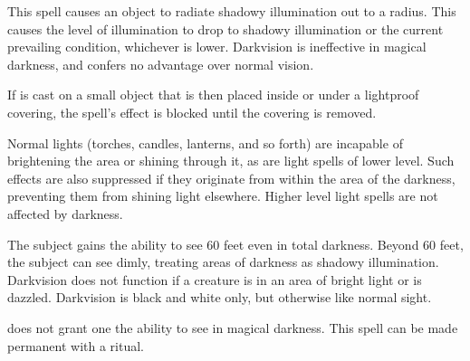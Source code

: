 \spellrng{\rngtouch}
\begin{spelleffect}
  This spell causes an object to radiate shadowy illumination out to a \areamed radius. This causes the level of illumination to drop to shadowy illumination or the current prevailing condition, whichever is lower. Darkvision is ineffective in magical darkness, and confers no advantage over normal vision.
\end{spelleffect}
\begin{spellnotes}
  If  is cast on a small object that is then placed inside or under a lightproof covering, the spell's effect is blocked until the covering is removed.

  Normal lights (torches, candles, lanterns, and so forth) are incapable of brightening the area or shining through it, as are light spells of lower level. Such effects are also suppressed if they originate from within the area of the darkness, preventing them from shining light elsewhere. Higher level light spells are not affected by darkness.
\end{spellnotes}

\spellrng{\rngtouch}
\spelldur{\durlong}
\begin{spelleffect}
  The subject gains the ability to see 60 feet even in total darkness. Beyond 60 feet, the subject can see dimly, treating areas of darkness as shadowy illumination. Darkvision does not function if a creature is in an area of bright light or is dazzled. Darkvision is black and white only, but otherwise like normal sight.
\end{spelleffect}
\begin{spellnotes}
   does not grant one the ability to see in magical darkness. This spell can be made permanent with a  ritual.
\end{spellnotes}

